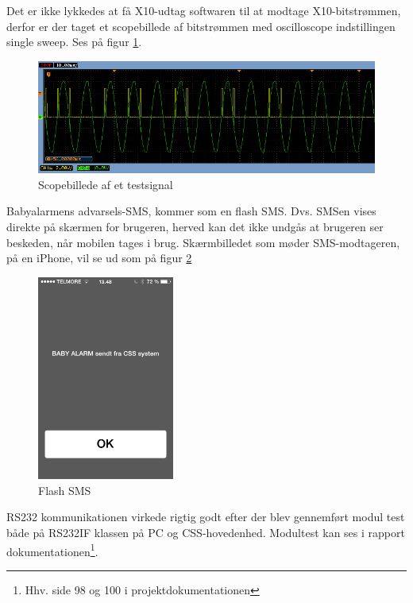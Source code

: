 Det er ikke lykkedes at få X10-udtag softwaren til at modtage X10-bitstrømmen, derfor er der taget et scopebillede af bitstrømmen med oscilloscope indstillingen single sweep. Ses på figur \ref{fig:Scop_test}.

\begin{figure}[htbp]
  \centering
    \includegraphics[width=\textwidth]{billeder/Modtager_0101_ON}
    \caption{Scopebillede af et testsignal}
    \label{fig:Scop_test}
\end{figure}

 
 
Babyalarmens advarsels-SMS, kommer som en flash SMS. Dvs. SMSen vises direkte på skærmen for brugeren, herved kan det ikke undgås at brugeren ser beskeden, når mobilen tages i brug. Skærmbilledet som møder SMS-modtageren, på en iPhone, vil se ud som på figur \ref{fig:flashSMS}
 
\begin{figure}[htbp]
  \centering
    \includegraphics[width=0.4\textwidth]{billeder/flashSMS}
    \caption{Flash SMS}
    \label{fig:flashSMS}
\end{figure}
 
RS232 kommunikationen virkede rigtig godt efter der blev gennemført modul test både på RS232IF klassen på PC og CSS-hovedenhed. Modultest kan ses i rapport dokumentationen\footnote{Hhv. side 98 og 100 i projektdokumentationen}.

